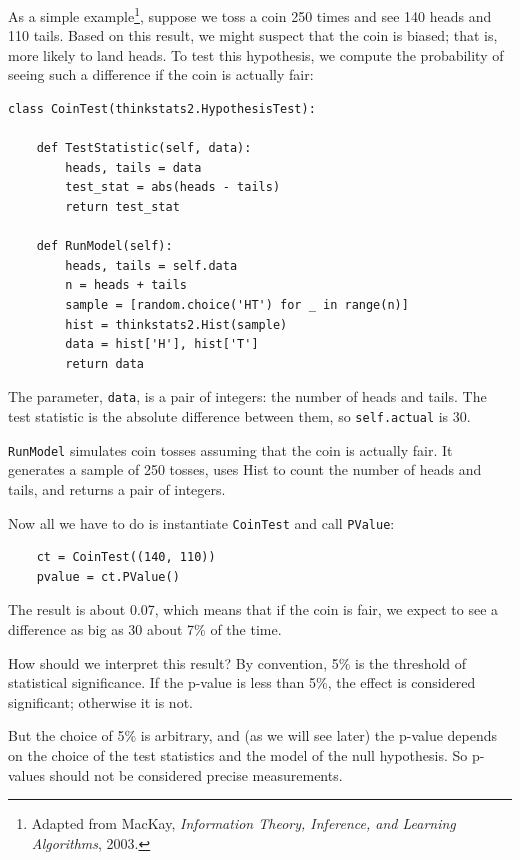 \documentclass[12pt]{book}
\theoremstyle{exercise}
\begin{document}
As a simple example\footnote{Adapted from MacKay, {\it Information
    Theory, Inference, and Learning Algorithms}, 2003.}, suppose we
toss a coin 250 times and see 140 heads and 110 tails.  Based on this
result, we might suspect that the coin is biased; that is, more likely
to land heads.  To test this hypothesis, we compute the
probability of seeing such a difference if the coin is actually
fair:%
%

\begin{verbatim}
class CoinTest(thinkstats2.HypothesisTest):

    def TestStatistic(self, data):
        heads, tails = data
        test_stat = abs(heads - tails)
        return test_stat

    def RunModel(self):
        heads, tails = self.data
        n = heads + tails
        sample = [random.choice('HT') for _ in range(n)]
        hist = thinkstats2.Hist(sample)
        data = hist['H'], hist['T']
        return data
\end{verbatim}

The parameter, {\tt data}, is a pair of
integers: the number of heads and tails.  The test statistic is
the absolute difference between them, so {\tt self.actual}
is 30.%

{\tt RunModel} simulates coin tosses assuming that the coin is
actually fair.  It generates a sample of 250 tosses, uses Hist
to count the number of heads and tails, and returns a pair of
integers.%
%

Now all we have to do is instantiate {\tt CoinTest} and call
{\tt PValue}:

\begin{verbatim}
    ct = CoinTest((140, 110))
    pvalue = ct.PValue()
\end{verbatim}

The result is about 0.07, which means that if the coin is
fair, we expect to see a difference as big as 30 about 7\% of the
time.

How should we interpret this result?  By convention,
5\% is the threshold of statistical significance.  If the
p-value is less than 5\%, the effect is considered significant; otherwise
it is not.%
%
%

But the choice of 5\% is arbitrary, and (as we will see later) the
p-value depends on the choice of the test statistics and
the model of the null hypothesis.  So p-values should not be considered
precise measurements.%
\end{document}
